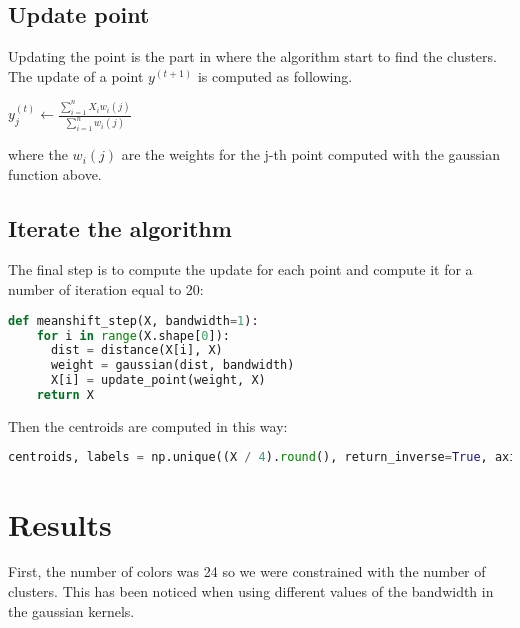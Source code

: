 \documentclass{ETHExercise}
\begin{document}
\subsection{Update point}
Updating the point is the part in where the algorithm start to find the clusters.
The update of a point $y^{(t+1)}$ is computed as following.

\begin{center}
  $y_j^{(t)} \leftarrow \frac{\sum\limits_{i=1}^{n}X_i w_i(j)}{\sum\limits_{i=1}^{n}w_i(j)}$
\end{center}

where the $w_i(j)$ are the weights for the j-th point computed with the gaussian function above.

\subsection{Iterate the algorithm}

The final step is to compute the update for each point and compute it for a number of iteration 
equal to 20:

\begin{lstlisting}[language=Python, caption=Mean-shift]
  def meanshift_step(X, bandwidth=1):
    for i in range(X.shape[0]):
      dist = distance(X[i], X)
      weight = gaussian(dist, bandwidth)
      X[i] = update_point(weight, X)
    return X
\end{lstlisting}

Then the centroids are computed in this way:
\begin{lstlisting}[language=Python, caption=Centroids]
  centroids, labels = np.unique((X / 4).round(), return_inverse=True, axis=0)
\end{lstlisting}

\section{Results}

First, the number of colors was 24 so we were constrained with the number of clusters.
This has been noticed when using different values of the bandwidth in the gaussian kernels.
\end{document}
